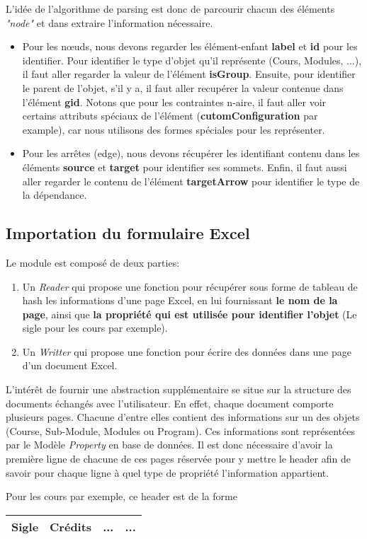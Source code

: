 L'idée de l'algorithme de parsing est donc de parcourir chacun des éléments \textit{"node"} et dans extraire l'information nécessaire. \\
\begin{itemize}
\item Pour les nœuds, nous devons regarder les élément-enfant \textbf{label} et \textbf{id} pour les identifier. Pour identifier le type d'objet qu'il représente (Cours, Modules, ...), il faut aller regarder la valeur de l'élément \textbf{isGroup}. Ensuite, pour identifier le parent de l'objet, s'il y a, il faut aller recupérer la valeur contenue dans l'élément \textbf{gid}. Notons que pour les contraintes n-aire, il faut aller voir certains attributs spéciaux de l'élément (\textbf{cutomConfiguration} par example), car nous utilisons des formes spéciales pour les représenter.
\item Pour les arrêtes (edge), nous devons récupérer les identifiant contenu dans les éléments \textbf{source} et \textbf{target} pour identifier ses sommets. Enfin, il faut aussi aller regarder le contenu de l'élément \textbf{targetArrow}  pour identifier le type de la dépendance.
\end{itemize}
\subsection{Importation du formulaire Excel}
Le module est composé de deux parties: 
\begin{enumerate}
\item Un \textit{Reader} qui propose une fonction pour récupérer sous forme de tableau de hash les informations d'une page Excel, en lui fournissant \textbf{le nom de la page}, ainsi que \textbf{la propriété qui est utilisée pour identifier l'objet} (Le sigle pour les cours par exemple).
\item Un \textit{Writter} qui propose une fonction pour écrire des données dans une page d'un document Excel.
\end{enumerate}

L'intérêt de fournir une abstraction supplémentaire se situe sur la structure des documents échangés avec l'utilisateur. En effet, chaque document comporte plusieurs pages. Chacune d'entre elles contient des informations sur un des objets (Course, Sub-Module, Modules ou Program). Ces informations sont représentées par le Modèle \textit{Property} en base de données. Il est donc nécessaire d'avoir la première ligne de chacune de ces pages réservée pour y mettre le header afin de savoir pour chaque ligne à quel type de propriété l'information appartient.

Pour les cours par exemple, ce header est de la forme
\begin{tabular}{| c | c | c | c |}
\hline
\textbf{Sigle} & \textbf{Crédits} & \textbf{...} & \textbf{...}\\
\hline
\end{tabular}  
